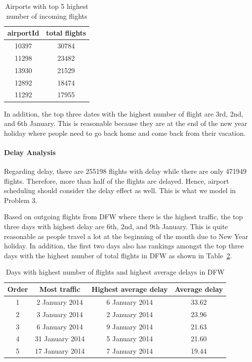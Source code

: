\documentclass[11pt,a4paper]{article}
\begin{document}
\begin{table}
\caption{Airports with top 5 highest number of incoming flights}
\centering
\begin{tabular}{| c | c |}
\hline
airportId & total flights \\
\hline
10397&30784 \\
11298&23482 \\
13930&21529 \\
12892&18474 \\
11292&17955 \\
\hline
\end{tabular}
\label{fig:airport-flight-in}
\end{table}

In addition, the top three dates with the highest number of flight are 3rd, 2nd, and 6th January. This is reasonable because they are at the end of the new year holiday where people need to go back home and come back from their vacation.

\paragraph{Delay Analysis}
Regarding delay, there are 255198 flights with delay while there are only 471949 flights. Therefore, more than half of the flights are delayed. Hence, airport scheduling should consider the delay effect as well. This is what we model in Problem 3. \par
Based on outgoing flights from DFW where there is the highest traffic, the top three days with highest delay are 6th, 2nd, and 9th January. This is quite reasonable as people travel a lot at the beginning of the month due to New Year holiday. In addition, the first two days also has rankings amongst the top three days with the highest number of total flights in DFW as shown in Table~\ref{table:airport-dfw-delay}.

\begin{table}
\caption{Days with highest number of flights and highest average delays in DFW}
\centering
\begin{tabular}{| c | c | c | c |}
\hline
Order & Most traffic & Highest average delay & Average delay \\
\hline
1 & 2 January 2014 & 6 January 2014 & 33.62\\
2 & 3 January 2014 & 2 January 2014 & 23.96\\
3 & 6 January 2014 & 9 January 2014 & 21.63\\
4 & 31 January 2014 & 5 January 2014 & 21.60\\
5 & 17 January 2014 & 7 January 2014 & 19.44\\
\hline
\end{tabular}
\label{table:airport-dfw-delay}
\end{table}
\end{document}
